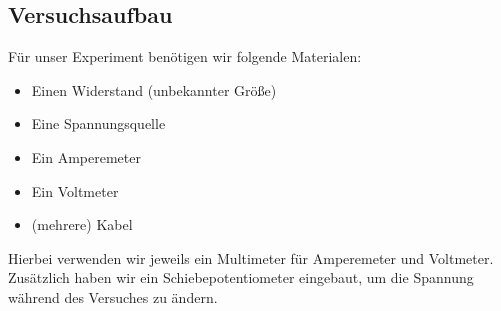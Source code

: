 \documentclass[10pt,a4paper]{article}
\begin{document}
\subsection{Versuchsaufbau}
\begin{flushleft}
Für unser Experiment benötigen wir folgende Materialen:

\begin{itemize}
\item Einen Widerstand (unbekannter Größe)
\item Eine Spannungsquelle
\item Ein Amperemeter
\item Ein Voltmeter
\item (mehrere) Kabel
\end{itemize}

Hierbei verwenden wir jeweils ein Multimeter für Amperemeter und Voltmeter. Zusätzlich haben wir ein Schiebepotentiometer eingebaut, um die Spannung während des Versuches zu ändern.
\end{flushleft}
\end{document}
